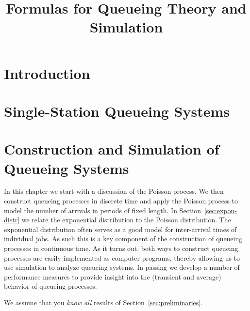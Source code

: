 \documentclass{book}
\title{Formulas for Queueing Theory and Simulation}
\begin{document}
\frontmatter
\maketitle


\tableofcontents


\chapter{Introduction}\label{sec:introduction}

%
%
%

\mainmatter
\chapter{Single-Station Queueing Systems}

\chapter{Construction and Simulation of Queueing Systems}
\label{cha:single-stat-queu}

In this chapter we start with a discussion of the Poisson process.
We then construct queueing processes in discrete time and apply the Poisson process to model the number of arrivals in periods of fixed length.
In Section~\ref{sec:expon-distr} we relate the exponential distribution to the Poisson distribution.
The exponential distribution often serves as a good model for inter-arrival times of individual jobs.
As such this is a key component of the construction of queueing processes in continuous time.
As it turns out, both ways to construct queueing processes are easily implemented as computer programs, thereby allowing us to use simulation to analyze queueing systems.
In passing we develop a number of performance measures to provide insight into the (transient and average) behavior of queueing processes.

We assume that you  \emph{know all} results of Section~\ref{sec:preliminaries}. 

%
\end{document}
